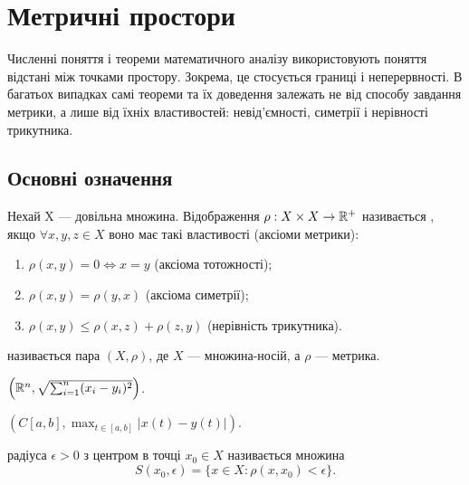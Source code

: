 \chapter{Метричні простори}

Численні поняття і теореми математичного аналізу
використовують поняття відстані між точками простору.
Зокрема, це стосується границі і неперервності. В багатьох
випадках самі теореми та їх доведення залежать не від
способу завдання метрики, а лише від їхніх властивостей:
невід’ємності, симетрії і нерівності трикутника.

\section{Основні означення}

\begin{definition}
Нехай X — довільна множина. Відображення
$\rho: X \times X \to \mathbb{R}^+$ називається , якщо $\forall x, y, z \in X$
воно має такі властивості (аксіоми метрики):
\begin{enumerate}
    \item $\rho(x, y) = 0 \iff x = y$ (аксіома тотожності);
    \item $\rho(x, y) = \rho(y, x)$ (аксіома симетрії);
    \item $\rho(x, y) \le \rho(x, z) + \rho(z, y)$ (нерівність трикутника).
\end{enumerate}
\end{definition}

\begin{definition}
 називається пара
$(X, \rho)$, де $X$ --- множи\-на-носій, а $\rho$ --- метрика.
\end{definition}

\begin{example}
$\left( \mathbb{R}^n, \sqrt{\sum_{i = 1}^n (x_i - y_i)^2} \right)$.
\end{example}

\begin{example}
$\left( C[a, b], \max_{t \in [a, b]} |x(t) - y(t)| \right)$.
\end{example}

\begin{definition}
 радіуса $\epsilon > 0$ з центром в
точці $x_0 \in X$ називається множина
\begin{equation*}
    S(x_0, \epsilon) = \{x \in X: \rho(x, x_0) < \epsilon \}.
\end{equation*}
\end{definition}

